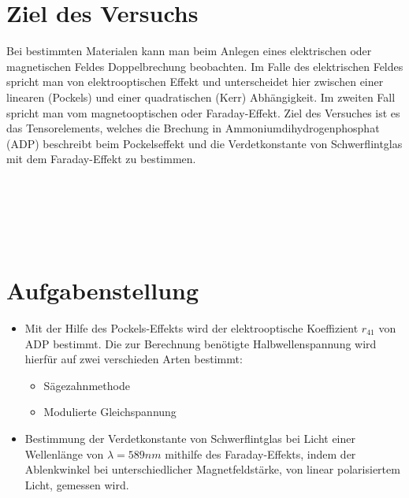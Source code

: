 \newpage
\section{Ziel des Versuchs}
Bei bestimmten Materialen kann man beim Anlegen eines elektrischen oder magnetischen Feldes Doppelbrechung beobachten. Im Falle des elektrischen Feldes spricht man von elektrooptischen Effekt und unterscheidet hier zwischen einer linearen (Pockels) und einer quadratischen (Kerr) Abhängigkeit. Im zweiten Fall spricht man vom magnetooptischen oder Faraday-Effekt. Ziel des Versuches ist es das Tensorelements, welches die Brechung in Ammoniumdihydrogenphosphat (ADP) beschreibt beim Pockelseffekt und die Verdetkonstante von Schwerflintglas mit dem Faraday-Effekt zu bestimmen.
~\\
~\\
~\\
~\\
~\\
~\\
\section{Aufgabenstellung}
\begin{itemize}
\item Mit der Hilfe des Pockels-Effekts wird der elektrooptische Koeffizient $r_{41}$ von ADP bestimmt. Die zur Berechnung benötigte Halbwellenspannung wird hierfür auf zwei verschieden Arten bestimmt:
\begin{itemize}
\item Sägezahnmethode
\item Modulierte Gleichspannung
\end{itemize}
\item Bestimmung der Verdetkonstante von Schwerflintglas bei Licht einer Wellenlänge von $\lambda = 589 nm $ mithilfe des Faraday-Effekts, indem der Ablenkwinkel bei unterschiedlicher Magnetfeldstärke, von linear polarisiertem Licht, gemessen wird.
\end{itemize}